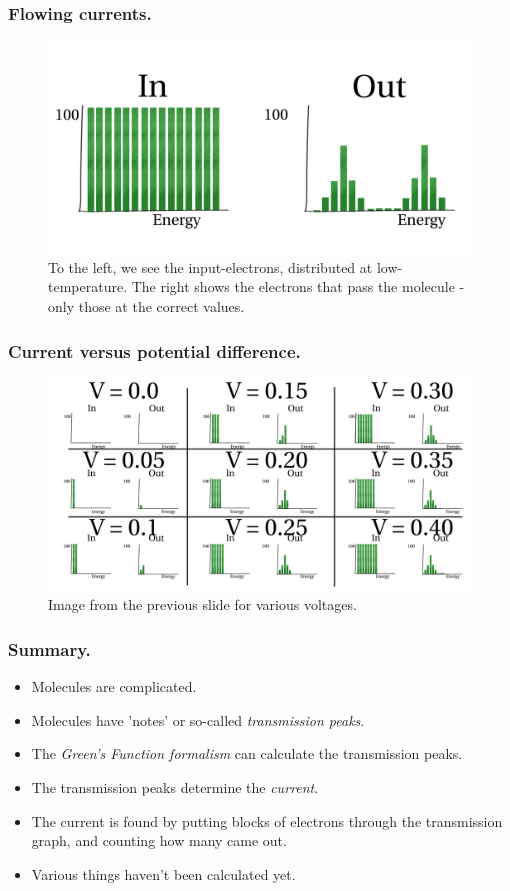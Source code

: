 \begin{frame}
    \frametitle{Flowing currents.}
    \begin{figure}[!b] 
        \centering
        \includegraphics[height=0.5\textheight]{fig/current.pdf}
        \caption{To the left, we see the input-electrons, distributed at low-temperature. The right shows the electrons that pass the molecule - only those at the correct values.}
    \end{figure} 
\end{frame}%
\begin{frame}
    \frametitle{Current versus potential difference.}
    \begin{figure}[!b] 
        \centering
        \includegraphics[width=\textwidth]{fig/current_calculation2.pdf}
        \caption{Image from the previous slide for various voltages.}
    \end{figure} 
\end{frame}%
% 
\begin{frame}
    \frametitle{Summary.}
    \begin{itemize}
        \item Molecules are complicated.
        \item Molecules have 'notes' or so-called \emph{transmission peaks}.
        \item The \emph{Green's Function formalism} can calculate the transmission peaks.
        \item The transmission peaks determine the \emph{current}.
        \item The current is found by putting blocks of electrons through the transmission graph, and counting how many came out.
        \item Various things haven't been calculated yet.
    \end{itemize} 
\end{frame}%
